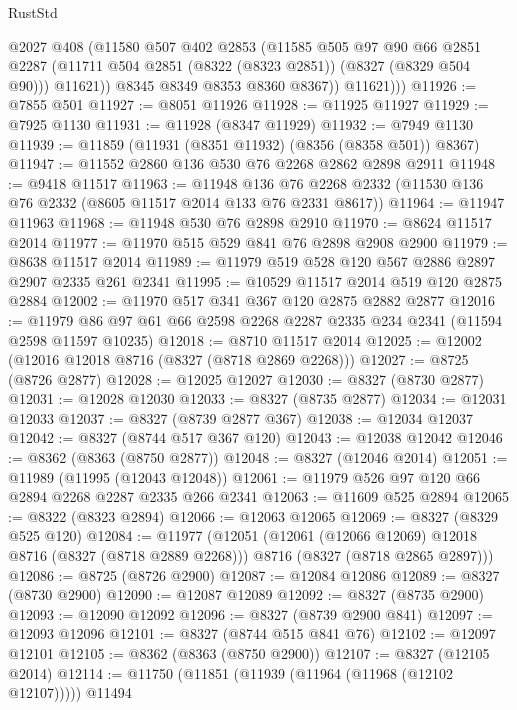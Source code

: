 \begin{lexlean}{RustStd}
\begin{coremodule}
{\begin{coremodule}
{{{{{{{{{{{{{{{{{{{{{{{{{{{{{{{{{{{{{{{{{{{{{{{{{{{{{{              @2027
              @408
              (@11580
                @507
                @402
                @2853
                (@11585
                  @505
                  @97
                  @90
                  @66
                  @2851
                  @2287
                  (@11711 @504 @2851 (@8322 (@8323 @2851)) (@8327 (@8329 @504 @90)))
                  @11621))
              @8345
              @8349
              @8353
              @8360
              @8367))
          @11621)))
@11926 := @7855 @501
@11927 := @8051 @11926
@11928 := @11925 @11927
@11929 := @7925 @1130
@11931 := @11928 (@8347 @11929)
@11932 := @7949 @1130
@11939 := @11859 (@11931 (@8351 @11932) (@8356 (@8358 @501)) @8367)
@11947 := @11552 @2860 @136 @530 @76 @2268 @2862 @2898 @2911
@11948 := @9418 @11517
@11963 := @11948
    @136
    @76
    @2268
    @2332
    (@11530 @136 @76 @2332 (@8605 @11517 @2014 @133 @76 @2331 @8617))
@11964 := @11947 @11963
@11968 := @11948 @530 @76 @2898 @2910
@11970 := @8624 @11517 @2014
@11977 := @11970 @515 @529 @841 @76 @2898 @2908 @2900
@11979 := @8638 @11517 @2014
@11989 := @11979 @519 @528 @120 @567 @2886 @2897 @2907 @2335 @261 @2341
@11995 := @10529 @11517 @2014 @519 @120 @2875 @2884
@12002 := @11970 @517 @341 @367 @120 @2875 @2882 @2877
@12016 := @11979 @86 @97 @61 @66 @2598 @2268 @2287 @2335 @234 @2341 (@11594 @2598 @11597 @10235)
@12018 := @8710 @11517 @2014
@12025 := @12002 (@12016 @12018 @8716 (@8327 (@8718 @2869 @2268)))
@12027 := @8725 (@8726 @2877)
@12028 := @12025 @12027
@12030 := @8327 (@8730 @2877)
@12031 := @12028 @12030
@12033 := @8327 (@8735 @2877)
@12034 := @12031 @12033
@12037 := @8327 (@8739 @2877 @367)
@12038 := @12034 @12037
@12042 := @8327 (@8744 @517 @367 @120)
@12043 := @12038 @12042
@12046 := @8362 (@8363 (@8750 @2877))
@12048 := @8327 (@12046 @2014)
@12051 := @11989 (@11995 (@12043 @12048))
@12061 := @11979 @526 @97 @120 @66 @2894 @2268 @2287 @2335 @266 @2341
@12063 := @11609 @525 @2894
@12065 := @8322 (@8323 @2894)
@12066 := @12063 @12065
@12069 := @8327 (@8329 @525 @120)
@12084 := @11977
    (@12051
      (@12061 (@12066 @12069) @12018 @8716 (@8327 (@8718 @2889 @2268)))
      @8716
      (@8327 (@8718 @2865 @2897)))
@12086 := @8725 (@8726 @2900)
@12087 := @12084 @12086
@12089 := @8327 (@8730 @2900)
@12090 := @12087 @12089
@12092 := @8327 (@8735 @2900)
@12093 := @12090 @12092
@12096 := @8327 (@8739 @2900 @841)
@12097 := @12093 @12096
@12101 := @8327 (@8744 @515 @841 @76)
@12102 := @12097 @12101
@12105 := @8362 (@8363 (@8750 @2900))
@12107 := @8327 (@12105 @2014)
@12114 := @11750 (@11851 (@11939 (@11964 (@11968 (@12102 @12107))))) @11494
}}}}}}}}}}}}}}}}}}}}}}}}}}}}}}}}}}}}}}}}}}}}}}}}}}}}}}
\end{coremodule}}
\end{coremodule}
\end{lexlean}

